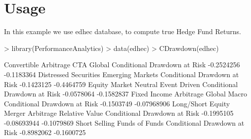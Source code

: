 \documentclass[12pt,letterpaper,english]{article}
\begin{document}
\section{Usage}

In this example we use edhec database, to compute true Hedge Fund Returns.

\begin{Schunk}
\begin{Sinput}
> library(PerformanceAnalytics)
> data(edhec)
> CDrawdown(edhec)
\end{Sinput}
\begin{Soutput}
                             Convertible Arbitrage CTA Global
Conditional Drawdown at Risk            -0.2524256 -0.1183364
                             Distressed Securities Emerging Markets
Conditional Drawdown at Risk            -0.1423125       -0.4464759
                             Equity Market Neutral Event Driven
Conditional Drawdown at Risk            -0.0578064   -0.1582837
                             Fixed Income Arbitrage Global Macro
Conditional Drawdown at Risk             -0.1503749  -0.07968906
                             Long/Short Equity Merger Arbitrage Relative Value
Conditional Drawdown at Risk        -0.1995105      -0.08693944     -0.1079869
                             Short Selling Funds of Funds
Conditional Drawdown at Risk    -0.8982062     -0.1600725
\end{Soutput}
\end{Schunk}
\end{document}
